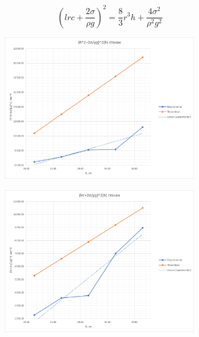 \documentclass[a4paper, 12pt]{article}
\begin{document}
\begin{equation}
    (lrc+\frac{2\sigma}{{\rho}g})^2=\frac{8}{3}r^3h+\frac{4\sigma^2}{\rho^2g^2}
\end{equation}

\begin{figure}[H]
    \begin{subfigure}{0.5\textwidth}
        \includegraphics[width=0.9\textwidth]{img/linear R стакан.png}
    \end{subfigure}%
    \begin{subfigure}{0.5\textwidth}
        \includegraphics[width=0.9\textwidth]{img/linear lrc стакан.png}
    \end{subfigure}
\end{figure}
\end{document}

